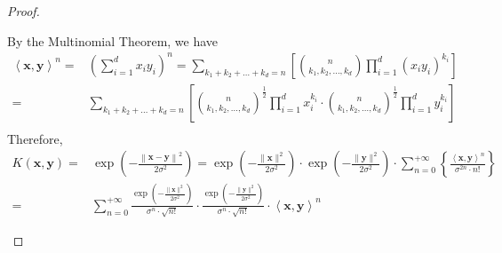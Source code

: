 \begin{proof}
\begin{enumerate}
              By the Multinomial Theorem, we have
              \begin{equation*}
                  \begin{aligned}
                      \left\langle\mathbf{x},\mathbf{y}\right\rangle^{n}= & \left(\sum_{i=1}^{d}x_{i}y_{i}\right)^{n}=\sum_{k_{1}+k_{2}+\ldots+k_{d}=n}\left[\binom{n}{k_{1},k_{2},\ldots,k_{d}}\prod_{i=1}^{d}\left(x_{i}y_{i}\right)^{k_{i}}\right]                                     \\
                      =                                                   & \sum_{k_{1}+k_{2}+\ldots+k_{d}=n}\left[\binom{n}{k_{1},k_{2},\ldots,k_{d}}^{\frac{1}{2}}\prod_{i=1}^{d}x_{i}^{k_{i}}\cdot\binom{n}{k_{1},k_{2},\ldots,k_{d}}^{\frac{1}{2}}\prod_{i=1}^{d}y_{i}^{k_{i}}\right] \\
                  \end{aligned}
              \end{equation*}
              Therefore,
              \begin{equation*}
                  \begin{aligned}
                      K(\mathbf{x},\mathbf{y})= & \exp\left(-\frac{\left\|\mathbf{x}-\mathbf{y}\right\|^{2}}{2\sigma^{2}}\right)=\exp\left(-\frac{\|\mathbf{x}\|^{2}}{2\sigma^{2}}\right)\cdot\exp\left(-\frac{\|\mathbf{y}\|^{2}}{2\sigma^{2}}\right)\cdot\sum_{n=0}^{+\infty}\left\{\frac{\left\langle\mathbf{x},\mathbf{y}\right\rangle^{n}}{\sigma^{2n}\cdot n!}\right\} \\
                      =                         & \sum_{n=0}^{+\infty}\frac{\exp\left(-\frac{\|\mathbf{x}\|^{2}}{2\sigma^{2}}\right)}{\sigma^{n}\cdot\sqrt{n!}}\cdot\frac{\exp\left(-\frac{\|\mathbf{y}\|^{2}}{2\sigma^{2}}\right)}{\sigma^{n}\cdot\sqrt{n!}}\cdot\left\langle\mathbf{x},\mathbf{y}\right\rangle^{n}
                  \end{aligned}
              \end{equation*}


\end{enumerate}
\end{proof}
